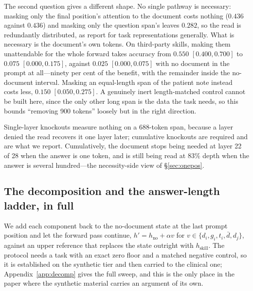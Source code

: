 \documentclass{article}
\newcommand{\dvec}{\ensuremath{d}}
\newcommand{\gvec}{\ensuremath{g}}
\newcommand{\tvec}{\ensuremath{t}}
\begin{document}
The second question gives a different shape. No single pathway is necessary:
masking only the final position's attention to the document costs nothing
($0.436$ against $0.436$) and masking only the question span's leaves $0.282$,
so the read is redundantly distributed, as \citet{jit2025taskrepr} report for
task representations generally. What is necessary is the document's own tokens.
On third-party skills, making them unattendable for the whole forward takes
accuracy from $0.550$ $[0.400, 0.700]$ to $0.075$ $[0.000, 0.175]$, against
$0.025$ $[0.000, 0.075]$ with no document in the prompt at all---ninety per cent
of the benefit, with the remainder inside the no-document interval. Masking an
equal-length span of the patient note instead costs less, $0.150$
$[0.050, 0.275]$. A genuinely inert length-matched control cannot be built here,
since the only other long span is the data the task needs, so this bounds
``removing 900 tokens'' loosely but in the right direction.

Single-layer knockouts measure nothing on a 688-token span, because a layer
denied the read recovers it one layer later; cumulative knockouts are required
and are what we report. Cumulatively, the document stops being needed at layer
22 of 28 when the answer is one token, and is still being read at $83\%$ depth
when the answer is several hundred---the necessity-side view of
\S\ref{sec:onepos}.




\subsection{The decomposition and the answer-length ladder, in full}
\label{app:onepos}

We add each component back to the no-document state at the last prompt position
and let the forward pass continue, $h' = h_{\text{no}} + \alpha v$ for
$v \in \{\dvec_i, \gvec_i, \tvec_i, \bar{\dvec}, \dvec_j\}$, against an upper
reference that replaces the state outright with $h_{\text{skill}}$. The
protocol needs a task with an exact zero floor and a matched negative control,
so it is established on the synthetic tier and then carried to the clinical one;
Appendix~\ref{app:decomp} gives the full sweep, and this is the only place in
the paper where the synthetic material carries an argument of its own.
\end{document}
